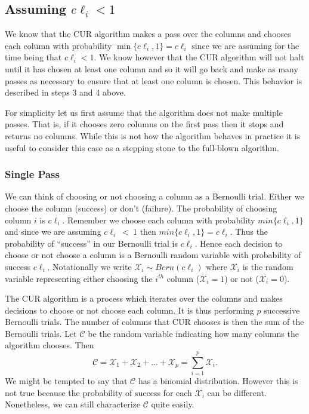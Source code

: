 \documentclass{book}
\begin{document}
\subsection{Assuming $c\ell_i < 1$}

We know that the CUR algorithm makes a pass over the columns and chooses each column with probability $\min\{c\ell_i,1\}=c\ell_i$ since we are assuming for the time being that $c\ell_i<1$. We know however that the CUR algorithm will not halt until it has chosen at least one column and so it will go back and make as many passes as necessary to ensure that at least one column is chosen. This behavior is described in steps 3 and 4 above. 

For simplicity let us first assume that the algorithm does not make multiple passes. That is, if it chooses zero columns on the first pass then it stops and returns no columns. While this is not how the algorithm behaves in practice it is useful to consider this case as a stepping stone to the full-blown algorithm. 

\subsubsection{Single Pass}
We can think of choosing or not choosing a column as a Bernoulli trial. Either we choose the column (success) or don't (failure). The probability of choosing column $i$ is $c\ell_i$. Remember we choose each column with probability $min\{c\ell_i,1\}$ and since we are assuming $c\ell_i~<~1$ then $min\{c\ell_i,1\}=c\ell_i$. Thus the probability of ``success'' in our Bernoulli trial is $c\ell_i$. Hence each decision to choose or not choose a column is a Bernoulli random variable with probability of success $c\ell_i$. Notationally we write $\mathscr{X}_i \sim Bern(c\ell_i)$ where $\mathscr{X}_i$ is the random variable representing either choosing the $i^{th}$ column ($\mathscr{X}_i=1$) or not ($\mathscr{X}_i=0$). 

The CUR algorithm is a process which iterates over the columns and makes decisions to choose or not choose each column. It is thus performing $p$ successive Bernoulli trials. The number of columns that CUR chooses is then the sum of the Bernoulli trials. Let $\mathscr{C}$ be the random variable indicating how many columns the algorithm chooses. Then 
$$
\mathscr{C}=\mathscr{X}_1+\mathscr{X}_2+\ldots+\mathscr{X}_p=\sum_{i=1}^{p}\mathscr{X}_i.
$$
We might be tempted to say that $\mathscr{C}$ has a binomial distribution. However this is not true because the probability of success for each $\mathscr{X}_i$ can be different. Nonetheless, we can still characterize $\mathscr{C}$ quite easily. 
\end{document}
